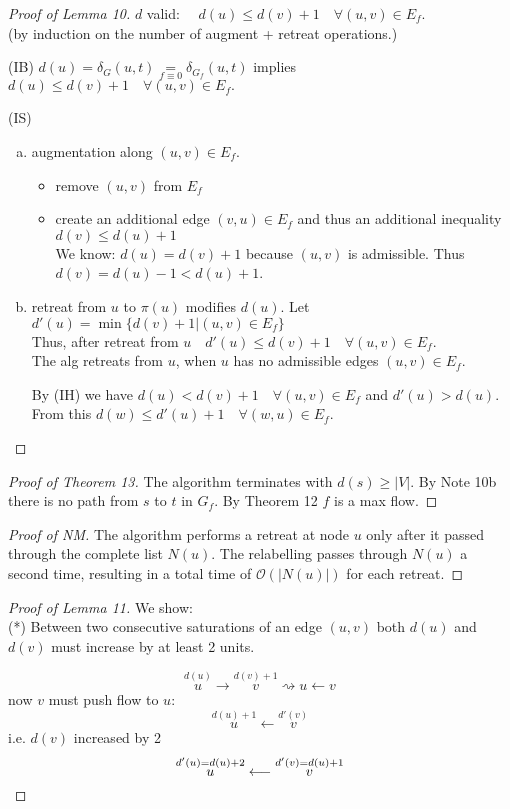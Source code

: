 \documentclass[12pt,oneside,a4paper,parskip=on,fleqn]{scrartcl}
\begin{document}
\begin{proof}[Proof of Lemma 10]
	$d$ valid: $\quad d(u) \leq d(v) + 1\quad \forall (u,v)\in E_f.$\\
	(by induction on the number of augment + retreat operations.)

	(IB) $d(u) = \delta_G(u,t) \underset{f\equiv 0}{=} \delta_{G_f}(u,t)$ implies $d(u)\leq d(v) + 1 \quad \forall (u,v)\in E_f.$

	(IS)
	\begin{enumerate}[a)]\item augmentation along $(u,v) \in E_f.$
		\begin{itemize}
			\item remove $(u,v)$ from $E_f$
			\item create an additional edge $(v,u)\in E_f$ and thus an additional inequality $d(v) \leq d(u) + 1$\\
			We know: $d(u) = d(v) + 1$ because $(u,v)$ is admissible.
			Thus $d(v) = d(u) - 1 < d(u) + 1$.
		\end{itemize}
		\item retreat from $u$ to $\pi(u)$ modifies $d(u)$. Let $d'(u) = \min\{ d(v) + 1|(u,v)\in E_f \}$\\
		Thus, after retreat from $u \quad d'(u) \leq d(v) + 1\quad \forall (u,v)\in E_f$.\\
		The alg retreats from $u$, when $u$ has no admissible edges $(u,v)\in E_f$.

		By (IH) we have $d(u) < d(v) + 1\quad \forall (u,v)\in E_f$ and $d'(u) > d(u)$.\\
		From this $d(w) \leq d'(u) + 1 \quad \forall (w,u)\in E_f.$
	\end{enumerate}
\end{proof}

\begin{proof}[Proof of Theorem 13]
	The algorithm terminates with  $d(s) \geq |V|$. By Note 10b there is no path from $s$ to $t$ in $G_f$. By Theorem 12 $f$ is a max flow.
\end{proof}

\begin{proof}[Proof of NM]
	The algorithm performs a retreat at node $u$ only after it passed through the complete list $N(u)$. The relabelling passes through $N(u)$ a second time, resulting in a total time of $\mathcal{O}(|N(u)|)$ for each retreat.
\end{proof}

\begin{proof}[Proof of Lemma 11]
	We show:\\
	(*) Between two consecutive saturations of an edge $(u,v)$ both $d(u)$ and $d(v)$ must increase by at least 2 units.

	\[
		\overset{d(u)}{u} \longrightarrow \overset{d(v)+1}{v} \rightsquigarrow u \leftarrow v
	\]
	now $v$ must push flow to $u$:
	\[
		\overset{d(u)+1}{u} \longleftarrow \overset{d'(v)}{v}
	\]
	i.e. $d(v)$ increased by 2
	\[
		\overset{d'(u) = d(u)+2}{u} \longleftarrow \overset{d'(v) = d(u)+1}{v}\qedhere
	\]
\end{proof}
\end{document}
